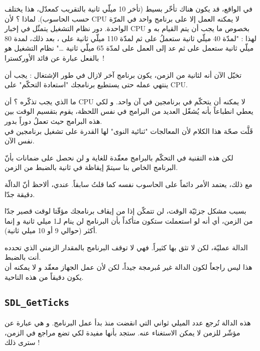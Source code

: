 في الواقع، قد يكون هناك تأخّر بسيط (تأخر 10 ميلّي ثانية بالتقريب كمعدّل، هذا يختلف حسب الحاسوب). لماذا ؟ لأن
\textenglish{CPU}
لا يمكنه العمل إلا على برنامج واحد في المرّة الواحدة. دور نظام التشغيل يتمثّل في إخبار
\textenglish{CPU}
بخصوص ما يجب أن يتم القيام به و لهذا : "لمدّة 40 ميلّي ثانية ستعملُ على
ثم لمدّة 110 ميلّي ثانية على 
،
بعد ذلك، لمدة 80 ميلّي ثانية ستعمل على
ثم عد إلى العمل على
لمدّة 65 ميلّي ثانية
\dots"
نظام التشغيل هو بالفعل عبارة عن قائد الأوركسترا~!

تخيّل الآن أنه لثانية من الزمن، يكون برنامج آخر لازال في طور الإشتغال : يجب أن ينتهي عمله حتى يستطيع برنامجك "استعادة التحكّم" على
\textenglish{CPU}.

ما الذي يجب تذكّره ؟ أن
\textenglish{CPU}
لا يمكنه أن يتحكّم في برنامجين في آن واحد. و لكي يعطي انطباعاً بأنه يُشغّل العديد من البرامج في نفس اللحظة، يقوم بتقسيم الوقت بين هذه البرامج حيث تعملُ دوراً بدور.\\
قَلَّت صحّة هذا الكلام لأن المعالجات "ثنائية النوى" لها القدرة على تشغيل برنامجين في نفس الآن. 

لكن هذه التقنية في التحكّم بالبرامج معقّدة للغاية و لن نحصل على ضمانات بأنّ البرنامج الخاص بنا سيتمّ إيقاظة في ثانية بالضبط من الزمن.

مع ذلك، يعتمد الأمر دائماً على الحاسوب نفسه كما قلتُ سابقاً. عندي، ألاحظ أنّ الدالّة
دقيقة جدّا.
\begin{information}
 بسبب مشكل جزئيّة الوقت، لن تتمكّن إذا من إيقاف برنامجك مؤقّتا لوقت قصير جدّا من الزمن، أي أنه لو استعملت 
ستكون متأكداً بأن البرنامج لن ينام لـ1 ميلي ثانية و إنما أكثر (حوالي 9 أو 10 ميلي ثانية).
\end{information}

الدالة
عمليّة، لكن لا تثق بها كثيراً. فهي لا توقف البرنامج بالمقدار الزمني الذي تحدده أنت بالضبط. \\
هذا ليس راجعاً لكون الدالة غير مُبرمجة جيداً، لكن لأن عمل الجهاز معقّد و لا يمكنه أن يكون دقيقاً من هذه الناحية.

\subsection{\texttt{SDL\_GetTicks}}

هذه الدالة تُرجع عدد الميلي ثواني التي انقضت منذ بدأ عمل البرنامج. و هي عبارة عن مؤشّر للزمن لا يمكن الاستغناء عنه. ستجد بأنها مفيدة لكي تضع مراجع في الزمن، سترى ذلك !

